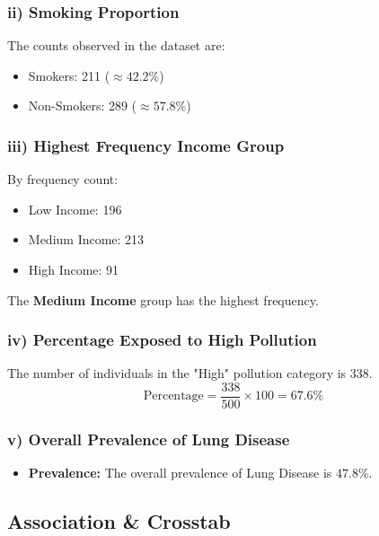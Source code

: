 \documentclass[12pt]{article}
\begin{document}
\subsubsection{ii) Smoking Proportion}
The counts observed in the dataset are:
\begin{itemize}
    \item Smokers: 211 ($\approx 42.2\%$)
    \item Non-Smokers: 289 ($\approx 57.8\%$)
\end{itemize}

\subsubsection{iii) Highest Frequency Income Group}
By frequency count:
\begin{itemize}
    \item Low Income: 196
    \item Medium Income: 213
    \item High Income: 91
\end{itemize}
The \textbf{Medium Income} group has the highest frequency.

\subsubsection{iv) Percentage Exposed to High Pollution}
The number of individuals in the "High" pollution category is 338.
\[ \text{Percentage} = \frac{338}{500} \times 100 = 67.6\% \]
\subsubsection{v) Overall Prevalence of Lung Disease}
\begin{itemize}
Prevalence is defined as the total number of cases divided by the total population:
\[ \text{Prevalence} = \frac{239}{500} = 0.478 \text{ (47.8\%)} \]
\item \textbf{Prevalence:} The overall prevalence of Lung Disease is $47.8\%$.
\end{itemize}

\subsection{Association \& Crosstab}
\end{document}
